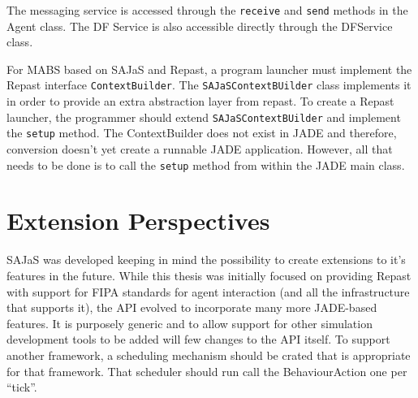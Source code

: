 The messaging service is accessed through the \texttt{receive} and \texttt{send} methods in the Agent class. The DF Service is also accessible directly through the DFService class.

For MABS based on SAJaS and Repast, a program launcher must implement the Repast interface \texttt{ContextBuilder}. The \texttt{SAJaSContextBUilder} class implements it in order to provide an extra abstraction layer from repast. To create a Repast launcher, the programmer should extend \texttt{SAJaSContextBUilder} and implement the \texttt{setup} method. The ContextBuilder does not exist in JADE and therefore, conversion doesn't yet create a runnable JADE application. However, all that needs to be done is to call the \texttt{setup} method from within the JADE main class.


\section{Extension Perspectives}

SAJaS was developed keeping in mind the possibility to create extensions to it's features in the future. While this thesis was initially focused on providing Repast with support for FIPA standards for agent interaction (and all the infrastructure that supports it), the API evolved to incorporate many more JADE-based features. It is purposely generic and to allow support for other simulation development tools to be added will few changes to the API itself. To support another framework, a scheduling mechanism should be crated that is appropriate for that framework. That scheduler should run call the BehaviourAction one per ``tick''.



%
%
%
%
%
